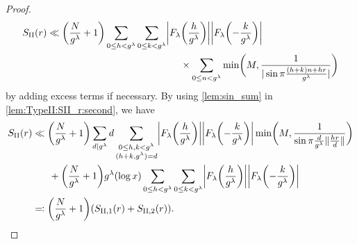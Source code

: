 \documentclass[hidelinks]{amsart}
\numberwithin{equation}{section}
\theoremstyle{plain}
\theoremstyle{definition}
\begin{document}
\begin{proof}
\begin{equation}
\label{lem:TypeII:SII_r:second}
\begin{aligned}
S_{\mathrm{II}}(r)
&\ll
\biggl(\frac{N}{g^{\lambda}}+1\biggr)
\sum_{0\le h<g^{\lambda}}
\sum_{0\le k<g^{\lambda}}
\biggl|F_{\lambda}\biggl(\frac{h}{g^{\lambda}}\biggr)\biggr|
\biggl|F_{\lambda}\biggl(-\frac{k}{g^{\lambda}}\biggr)\biggr|\\
&\hspace{0.4\textwidth}
\times
\sum_{0\le n<g^{\lambda}}
\min\biggl(
M,
\frac{1}{|\sin\pi\frac{(h+k)n+hr}{g^{\lambda}}|}
\biggr)
\end{aligned}
\end{equation}
by adding excess terms if necessary. By using \cref{lem:sin_sum} in \cref{lem:TypeII:SII_r:second}, we have
\begin{equation}
\label{lem:TypeII:T:after_sin_sum}
\begin{aligned}
S_{\mathrm{II}}(r)
&\ll
\biggl(\frac{N}{g^{\lambda}}+1\biggr)
\sum_{d\mid g^{\lambda}}
d
\sum_{\substack{
0\le h,k<g^{\lambda}\\
(h+k,g^{\lambda})=d
}}
\biggl|F_{\lambda}\biggl(\frac{h}{g^{\lambda}}\biggr)\biggr|
\biggl|F_{\lambda}\biggl(-\frac{k}{g^{\lambda}}\biggr)\biggr|
\min\biggl(
M,
\frac{1}{\sin\pi\frac{d}{g^{\lambda}}\|\frac{hr}{d}\|}
\biggr)\\
&\hspace{0.05\textwidth}
+
\biggl(\frac{N}{g^{\lambda}}+1\biggr)
g^{\lambda}(\log x)
\sum_{0\le h<g^{\lambda}}
\sum_{0\le k<g^{\lambda}}
\biggl|F_{\lambda}\biggl(\frac{h}{g^{\lambda}}\biggr)\biggr|
\biggl|F_{\lambda}\biggl(-\frac{k}{g^{\lambda}}\biggr)\biggr|\\
&\eqqcolon
\biggl(\frac{N}{g^{\lambda}}+1\biggr)
(S_{\mathrm{II},1}(r)+S_{\mathrm{II},2}(r)).
\end{aligned}
\end{equation}


\end{proof}
\end{document}
